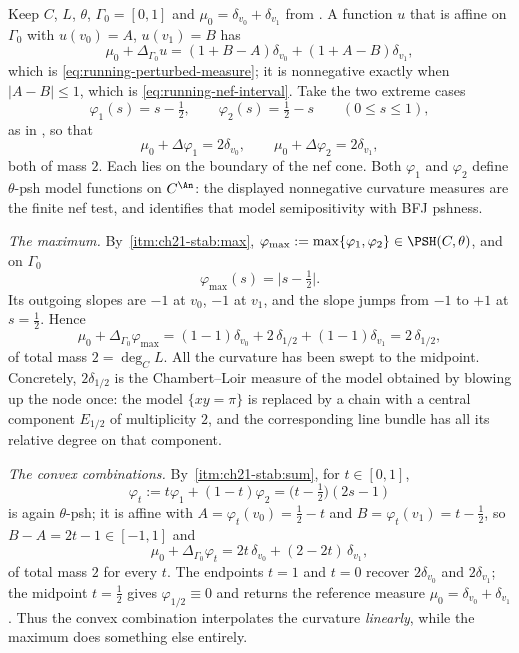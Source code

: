 \begin{example}
\label{ex:ch21-conic-numbers}
Keep $C$, $L$, $\theta$, $\Gamma_0=[0,1]$ and
$\mu_0=\delta_{v_0}+\delta_{v_1}$ from
.  A function $u$ that is affine on
$\Gamma_0$ with $u(v_0)=A$, $u(v_1)=B$ has
\[
 \mu_0+\Delta_{\Gamma_0}u=(1+B-A)\delta_{v_0}+(1+A-B)\delta_{v_1},
\]
which is \eqref{eq:running-perturbed-measure}; it is nonnegative exactly
when $|A-B|\leq1$, which is \eqref{eq:running-nef-interval}.  Take the two
extreme cases
\[
 \varphi_1(s)=s-\tfrac12,\qquad \varphi_2(s)=\tfrac12-s
 \qquad(0\leq s\leq1),
\]
as in , so that
\[
 \mu_0+\Delta\varphi_1=2\delta_{v_0},
 \qquad
  \mu_0+\Delta\varphi_2=2\delta_{v_1},
\]
both of mass $2$.  Each lies on the boundary of the nef cone.  Both
$\varphi_1$ and $\varphi_2$ define $\theta$-psh model functions on
$C^{\An}$: the displayed nonnegative curvature measures are the finite
nef test, and  identifies that model
semipositivity with BFJ pshness.

\emph{The maximum.}  By
\,\cref{itm:ch21-stab:max},
$\varphi_{\max}:=\max\{\varphi_1,\varphi_2\}\in\PSH(C,\theta)$, and on
$\Gamma_0$
\[
 \varphi_{\max}(s)=\bigl|s-\tfrac12\bigr| .
\]
Its outgoing slopes are $-1$ at $v_0$, $-1$ at $v_1$, and the
slope jumps from $-1$ to $+1$ at $s=\tfrac12$.  Hence
\begin{equation}
\label{eq:ch21-conic-max-measure}
 \mu_0+\Delta_{\Gamma_0}\varphi_{\max}
 =(1-1)\delta_{v_0}+2\,\delta_{1/2}+(1-1)\delta_{v_1}
 =2\,\delta_{1/2},
\end{equation}
of total mass $2=\deg_CL$.  All the curvature has been swept to the
midpoint.  Concretely, $2\delta_{1/2}$ is the Chambert--Loir measure of
the model obtained by blowing up the node once: the model
$\{xy=\pi\}$ is replaced by a chain with a central component
$E_{1/2}$ of multiplicity $2$, and the corresponding line bundle has all
its relative degree on that component.

\emph{The convex combinations.}  By
\,\cref{itm:ch21-stab:sum}, for $t\in[0,1]$,
\[
 \varphi_t:=t\varphi_1+(1-t)\varphi_2
 =\bigl(t-\tfrac12\bigr)(2s-1)
\]
is again $\theta$-psh; it is affine with $A=\varphi_t(v_0)=\tfrac12-t$
and $B=\varphi_t(v_1)=t-\tfrac12$, so $B-A=2t-1\in[-1,1]$ and
\begin{equation}
\label{eq:ch21-conic-convex-measure}
 \mu_0+\Delta_{\Gamma_0}\varphi_t
 =2t\,\delta_{v_0}+(2-2t)\,\delta_{v_1},
\end{equation}
of total mass $2$ for every $t$.  The endpoints $t=1$ and $t=0$
recover $2\delta_{v_0}$ and $2\delta_{v_1}$; the midpoint $t=\tfrac12$
gives $\varphi_{1/2}\equiv0$ and returns the reference measure
$\mu_0=\delta_{v_0}+\delta_{v_1}$.  Thus the convex combination
interpolates the curvature \emph{linearly}, while the maximum does something
else entirely.


\end{example}
